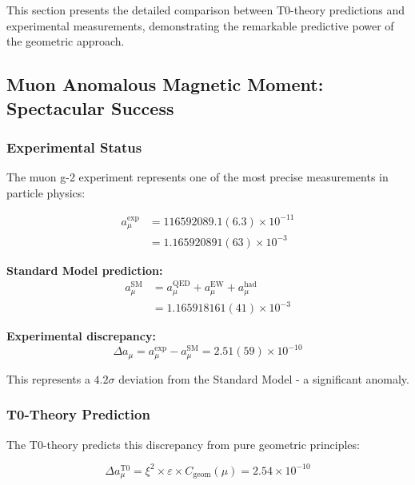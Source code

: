 \documentclass[12pt,a4paper]{article}
\numberwithin{equation}{section}
\newcommand{\xipar}{\xi}
\newcommand{\epsilonT}{\varepsilon}
\newcommand{\Cgeom}{C_{\text{geom}}}
\begin{document}
	This section presents the detailed comparison between T0-theory predictions and experimental measurements, demonstrating the remarkable predictive power of the geometric approach.
	
	\subsection{Muon Anomalous Magnetic Moment: Spectacular Success}
	
	\subsubsection{Experimental Status}
	
	The muon g-2 experiment represents one of the most precise measurements in particle physics:
	
	\begin{align}
		a_\mu^{\exp} &= 116592089.1(6.3) \times 10^{-11} \\
		&= 1.165920891(63) \times 10^{-3}
		\label{eq:muon_exp_precise}
	\end{align}
	
	\textbf{Standard Model prediction:}
	\begin{align}
		a_\mu^{\text{SM}} &= a_\mu^{\text{QED}} + a_\mu^{\text{EW}} + a_\mu^{\text{had}} \\
		&= 1.165918161(41) \times 10^{-3}
		\label{eq:muon_sm_prediction}
	\end{align}
	
	\textbf{Experimental discrepancy:}
	\begin{equation}
		\Delta a_\mu = a_\mu^{\exp} - a_\mu^{\text{SM}} = 2.51(59) \times 10^{-10}
		\label{eq:muon_discrepancy}
	\end{equation}
	
	This represents a $4.2\sigma$ deviation from the Standard Model - a significant anomaly.
	
	\subsubsection{T0-Theory Prediction}
	
	The T0-theory predicts this discrepancy from pure geometric principles:
	
	\begin{equation}
		\Delta a_\mu^{\text{T0}} = \xipar^2 \times \epsilonT \times \Cgeom(\mu) = 2.54 \times 10^{-10}
		\label{eq:muon_t0_prediction}
	\end{equation}
	
\end{document}

